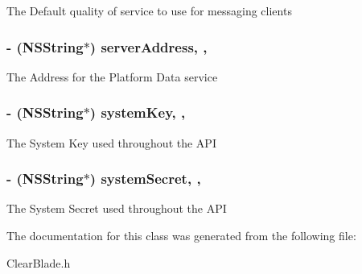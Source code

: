 The Default quality of service to use for messaging clients \hypertarget{interface_clear_blade_a254d692b3e85e4d33a4518e9ff9e4f40}{
\subsubsection[{server\+Address}]{\setlength{\rightskip}{0pt plus 5cm}-\/ (N\+S\+String$\ast$) server\+Address\hspace{0.3cm}{\ttfamily [read]}, {\ttfamily [atomic]}, {\ttfamily [assign]}}}\label{interface_clear_blade_a254d692b3e85e4d33a4518e9ff9e4f40}
The Address for the Platform Data service \hypertarget{interface_clear_blade_aab0eaf0d5cb8cabae0889b19230859b5}{
\subsubsection[{system\+Key}]{\setlength{\rightskip}{0pt plus 5cm}-\/ (N\+S\+String$\ast$) system\+Key\hspace{0.3cm}{\ttfamily [read]}, {\ttfamily [atomic]}, {\ttfamily [assign]}}}\label{interface_clear_blade_aab0eaf0d5cb8cabae0889b19230859b5}
The System Key used throughout the A\+P\+I \hypertarget{interface_clear_blade_ac86550adaf64238807f4bc536af7d1d0}{
\subsubsection[{system\+Secret}]{\setlength{\rightskip}{0pt plus 5cm}-\/ (N\+S\+String$\ast$) system\+Secret\hspace{0.3cm}{\ttfamily [read]}, {\ttfamily [atomic]}, {\ttfamily [assign]}}}\label{interface_clear_blade_ac86550adaf64238807f4bc536af7d1d0}
The System Secret used throughout the A\+P\+I 

The documentation for this class was generated from the following file\+:\begin{DoxyCompactItemize}
\item 
Clear\+Blade.\+h\end{DoxyCompactItemize}
